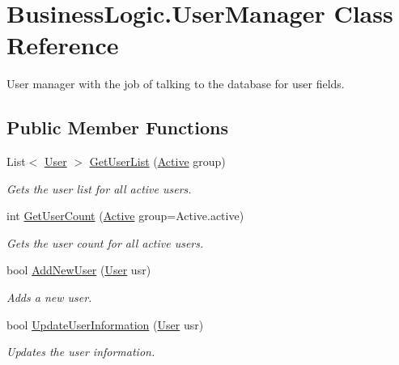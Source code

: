 \hypertarget{class_business_logic_1_1_user_manager}{}\section{Business\+Logic.\+User\+Manager Class Reference}
\label{class_business_logic_1_1_user_manager}


User manager with the job of talking to the database for user fields.  


\subsection*{Public Member Functions}
\begin{DoxyCompactItemize}
\item 
List$<$ \hyperlink{class_business_objects_1_1_user}{User} $>$ \hyperlink{class_business_logic_1_1_user_manager_a3056179e2041b2022e1a28356188c288}{Get\+User\+List} (\hyperlink{namespace_business_objects_a640a4d136931381578aad0a180173cfc}{Active} group)
\begin{DoxyCompactList}\small\item\em Gets the user list for all active users. \end{DoxyCompactList}\item 
int \hyperlink{class_business_logic_1_1_user_manager_a65be32ae93f260d00fc7d259470d8869}{Get\+User\+Count} (\hyperlink{namespace_business_objects_a640a4d136931381578aad0a180173cfc}{Active} group=Active.\+active)
\begin{DoxyCompactList}\small\item\em Gets the user count for all active users. \end{DoxyCompactList}\item 
bool \hyperlink{class_business_logic_1_1_user_manager_ab868aeac2dd021d3d230cceb099422c8}{Add\+New\+User} (\hyperlink{class_business_objects_1_1_user}{User} usr)
\begin{DoxyCompactList}\small\item\em Adds a new user. \end{DoxyCompactList}\item 
bool \hyperlink{class_business_logic_1_1_user_manager_a58674010581be08d264cb486810c9de8}{Update\+User\+Information} (\hyperlink{class_business_objects_1_1_user}{User} usr)
\begin{DoxyCompactList}\small\item\em Updates the user information. \end{DoxyCompactList}\end{DoxyCompactItemize}


